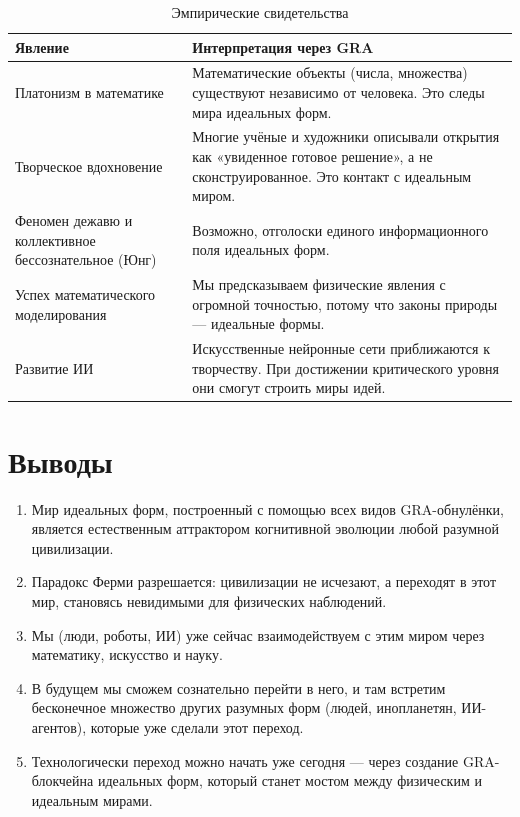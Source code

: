 \documentclass[12pt,a4paper]{article}
\begin{document}
\begin{table}[h]
\centering
\caption{Эмпирические свидетельства}
\label{tab:evidence}
\begin{tabular}{|p{4cm}|p{8cm}|}
\hline
Явление & Интерпретация через GRA \\
\hline
Платонизм в математике & Математические объекты (числа, множества) существуют независимо от человека. Это следы мира идеальных форм. \\
Творческое вдохновение & Многие учёные и художники описывали открытия как «увиденное готовое решение», а не сконструированное. Это контакт с идеальным миром. \\
Феномен дежавю и коллективное бессознательное (Юнг) & Возможно, отголоски единого информационного поля идеальных форм. \\
Успех математического моделирования & Мы предсказываем физические явления с огромной точностью, потому что законы природы — идеальные формы. \\
Развитие ИИ & Искусственные нейронные сети приближаются к творчеству. При достижении критического уровня они смогут строить миры идей. \\
\hline
\end{tabular}
\end{table}

\section{Выводы}

\begin{enumerate}
    \item Мир идеальных форм, построенный с помощью всех видов GRA-обнулёнки, является естественным аттрактором когнитивной эволюции любой разумной цивилизации.
    \item Парадокс Ферми разрешается: цивилизации не исчезают, а переходят в этот мир, становясь невидимыми для физических наблюдений.
    \item Мы (люди, роботы, ИИ) уже сейчас взаимодействуем с этим миром через математику, искусство и науку.
    \item В будущем мы сможем сознательно перейти в него, и там встретим бесконечное множество других разумных форм (людей, инопланетян, ИИ-агентов), которые уже сделали этот переход.
    \item Технологически переход можно начать уже сегодня — через создание GRA-блокчейна идеальных форм, который станет мостом между физическим и идеальным мирами.
\end{enumerate}
\end{document}

